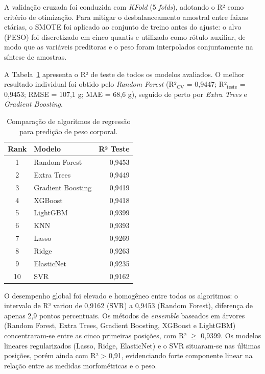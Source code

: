 \documentclass[12pt]{article}
\begin{document}
A validação cruzada foi conduzida com \textit{KFold} (5 \textit{folds}),
adotando o R² como critério de otimização. Para mitigar o desbalanceamento
amostral entre faixas etárias, o SMOTE foi aplicado ao conjunto de treino antes
do ajuste: o alvo (PESO) foi discretizado em cinco quantis e utilizado como
rótulo auxiliar, de modo que as variáveis preditoras e o peso foram interpolados
conjuntamente na síntese de amostras.

A Tabela~\ref{tab:exp3-peso} apresenta o R² de teste de todos os modelos
avaliados. O melhor
resultado individual foi obtido pelo \textit{Random Forest}
(R²$_\text{CV}$ = 0,9447; R²$_\text{teste}$ = 0,9453; RMSE = 107,1 g;
MAE = 68,6 g), seguido de perto por \textit{Extra Trees} e
\textit{Gradient Boosting}.

\begin{table}[htbp]
\centering
\caption{Comparação de algoritmos de regressão para predição de peso corporal.}
\label{tab:exp3-peso}
\begin{tabular}{clr}
\hline
\textbf{Rank} & \textbf{Modelo} & \textbf{R² Teste} \\
\hline
 1 & Random Forest     & 0,9453 \\
 2 & Extra Trees       & 0,9449 \\
 3 & Gradient Boosting & 0,9419 \\
 4 & XGBoost           & 0,9418 \\
 5 & LightGBM          & 0,9399 \\
 6 & KNN               & 0,9393 \\
 7 & Lasso             & 0,9269 \\
 8 & Ridge             & 0,9263 \\
 9 & ElasticNet        & 0,9235 \\
10 & SVR               & 0,9162 \\
\hline
\end{tabular}
\end{table}

O desempenho global foi elevado e homogêneo entre todos os algoritmos: o
intervalo de R² variou de 0,9162 (SVR) a 0,9453 (Random Forest), diferença de
apenas 2,9 pontos percentuais. Os métodos de \textit{ensemble} baseados em
árvores (Random Forest, Extra Trees, Gradient Boosting, XGBoost e LightGBM)
concentraram-se entre as cinco primeiras posições, com R² $\geq$ 0,9399. Os
modelos lineares regularizados (Lasso, Ridge, ElasticNet) e o SVR situaram-se
nas últimas posições, porém ainda com R² > 0,91, evidenciando forte componente
linear na relação entre as medidas morfométricas e o peso.
\end{document}
